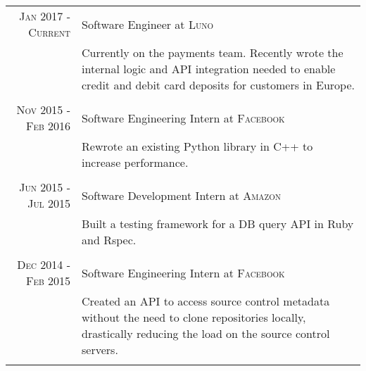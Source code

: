 \documentclass[a4paper,10pt]{article} %
\begin{document}
\begin{tabular}{r|p{11cm}}
\textsc{Jan 2017 - Current} & Software Engineer at \textsc{Luno} \emph{}\\
	& \footnotesize{Currently on the payments team. Recently wrote the internal logic and API \newline integration needed to enable credit and debit card deposits for customers in Europe.}\\
\multicolumn{2}{c}{} \\

\textsc{Nov 2015 - Feb 2016} & Software Engineering Intern at \textsc{Facebook} \emph{}\\
& \footnotesize{Rewrote an existing Python library in C++ to increase performance.}\\
\multicolumn{2}{c}{} \\

\textsc{Jun 2015 - Jul 2015} & Software Development Intern at \textsc{Amazon} \emph{}\\
& \footnotesize{Built a testing framework for a DB query API in Ruby and Rspec.}\\
\multicolumn{2}{c}{} \\

\textsc{Dec 2014 - Feb 2015} & Software Engineering Intern at \textsc{Facebook} \emph{}\\
& \footnotesize{Created an API to access source control metadata without the need to clone \newline repositories locally, drastically reducing the load on the source control servers.}\\
\multicolumn{2}{c}{} \\






\end{tabular}
\end{document}

